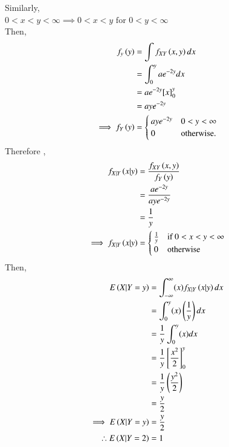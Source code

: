 \documentclass[journal,12pt,twocolumn]{IEEEtran}
\begin{document}
Similarly,\\
$ 0<x<y<\infty \implies 0<x<y \text{ for } 0<y<\infty$ \\
Then,
\begin{align}
    f_y\left(y\right) &= \int f_{XY}\left(x,y\right)dx\\
    &= \int_{0}^{y} ae^{-2y}dx\\
    &= ae^{-2y}[x]_{0}^{y}\\
    &= aye^{-2y}\\
\implies f_Y\left(y\right) &=
    \begin{cases}
    aye^{-2y} & 0 < y < \infty\\
    0 & \text{otherwise}.
    \end{cases}
\end{align}
Therefore ,
\begin{align}
    f_{X|Y}\left(x|y\right) &= \frac{f_{XY}\left(x,y\right)}{f_Y\left(y\right)}\\
    & = \frac{ae^{-2y}}{aye^{-2y}}\\
    & = \frac{1}{y}\\
\implies f_{X|Y}\left(x|y\right) &=
    \begin{cases}
    \frac{1}{y} & \text{if } 0<x<y<\infty\\
    0 & \text{otherwise}
    \end{cases}
\end{align}
Then, 
\begin{align}
   E\left(X|Y=y\right) & =
   \int_{-\infty}^{\infty} (x)f_{X|Y}\left(x|y\right)dx\\
    & = \int_{0}^{y}(x)\left(\frac{1}{y}\right)dx\\
    & = \frac{1}{y} \int_{0}^{y}(x)dx \\
    & = \frac{1}{y} \left[ \frac{x^2}{2}\right]_{0}^{y}\\
    & = \frac{1}{y}\left(\frac{y^2}{2}\right)\\
    & = \frac{y}{2}\\
\implies E\left(X|Y=y\right) &= \frac{y}{2}\\
\therefore E\left(X|Y=2\right) &= 1
\end{align}
\end{document}
